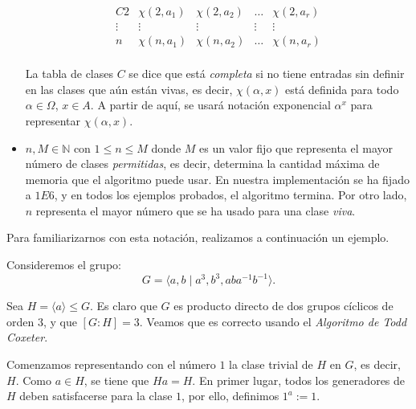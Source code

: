 \begin{itemize}
\[\begin{array}{c|*{4}{c}}{C}
    
    {}2&\chi(2, a_1)  &\chi(2, a_2)   &\ldots   &\chi(2, a_r)\\

    
    {}\vdots&\vdots&\vdots&\vdots&\vdots\\
    
    {}n&\chi(n, a_1)  &\chi(n, a_2)   &\ldots   &\chi(n, a_r)\\


    \end{array}
    \]
    
    La tabla de clases $C$ se dice que está \textit{completa} si no tiene entradas sin definir en las clases que aún están vivas, es decir, $\chi(\alpha, x)$ está definida para todo $\alpha \in \Omega$, $x \in A$. A partir de aquí, se usará notación exponencial $\alpha^x$ para representar $\chi(\alpha, x)$.
    


    \item $n,M \in \mathbb{N}$  con $ 1 \leq n \leq M$ donde $M$ es un valor fijo que representa el mayor número de clases \textit{permitidas}, es decir, determina la cantidad máxima de memoria que el algoritmo puede usar.  En nuestra implementación se ha fijado a $1E6$, y en todos los ejemplos probados, el algoritmo termina. Por otro lado, $n$ representa el mayor número que se ha usado para una clase \textit{viva}. \label{nm}
\end{itemize}

Para familiarizarnos con esta notación, realizamos a continuación un ejemplo.


\label{ejjjj}
 Consideremos el grupo:
\[
    G= \langle a,b \mid a^3, b^3, aba^{-1}b^{-1} \rangle .
\]

Sea $H = \langle a \rangle \leq G$. Es claro que $G$ es producto directo de dos grupos cíclicos de orden $3$, y que $[G:H]=3$. Veamos que es correcto usando el \textit{Algoritmo de Todd Coxeter}.


Comenzamos representando con el número $1$ la clase trivial de $H$ en $G$, es decir, $H$. Como $a \in H$, se tiene que $Ha = H$. En primer lugar, todos los generadores de $H$ deben satisfacerse para la clase $1$, por ello, definimos $1^a:=1$. 


\begin{center}
\end{center}


